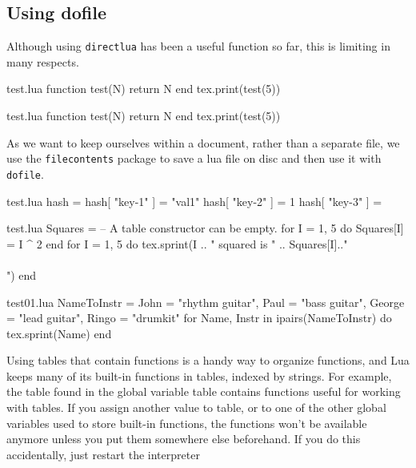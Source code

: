 \documentclass{tufte-book}
\begin{document}
\subsection{Using dofile}
Although using \lstinline{directlua} has been a useful function so far, this is limiting in many respects.
\begin{filecontents*}{test.lua}
 function test(N)
  return N
end
tex.print(test(5))
\end{filecontents*}
\begin{tcblisting}{}
\begin{filecontents*}{test.lua}
 function test(N)
  return N
end
tex.print(test(5))
\end{filecontents*}
\end{tcblisting}

As we want to keep ourselves within a document, rather than a separate file, we
use the \verb+filecontents+ package to save a lua file on disc and then use it with
\lstinline{dofile}.

\begin{tcblisting}{}
\begin{filecontents*}{test.lua}
hash = {}
hash[ "key-1" ] = "val1"
hash[ "key-2" ] = 1
hash[ "key-3" ] = {}
\end{filecontents*}
\end{tcblisting}


\begin{tcblisting}{}
\begin{filecontents*}{test.lua}
Squares = {} -- A table constructor can be empty.
 for I = 1, 5 do
   Squares[I] = I ^ 2
 end
 for I = 1, 5 do
   tex.sprint(I .. " squared is " .. Squares[I].."\\\\")
 end
\end{filecontents*}
\end{tcblisting}


\begin{tcblisting}{}
\begin{filecontents*}{test01.lua}
 NameToInstr = {John = "rhythm guitar",
 Paul = "bass guitar",
 George = "lead guitar",
 Ringo = "drumkit"}
 for Name, Instr in ipairs(NameToInstr) do
   tex.sprint(Name)
 end
\end{filecontents*}
\end{tcblisting}

\clearpage
Using tables that contain functions is a handy way to organize functions, and Lua keeps many of its
built-in functions in tables, indexed by strings. For example, the table found in the global variable table
contains functions useful for working with tables. If you assign another value to table, or to one of the
other global variables used to store built-in functions, the functions won’t be available anymore unless
you put them somewhere else beforehand. If you do this accidentally, just restart the interpreter
\end{document}
